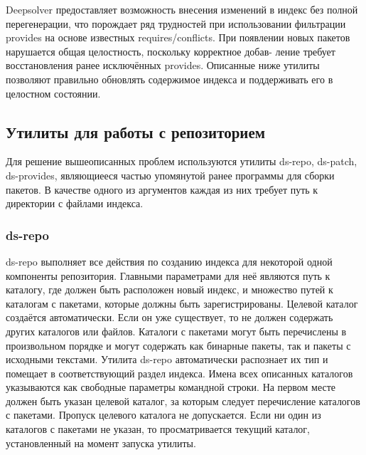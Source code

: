Deepsolver предоставляет возможность внесения изменений в индекс без
полной перегенерации, что порождает ряд трудностей при использовании
фильтрации provides на основе известных requires/conflicts. При появлении
новых пакетов нарушается общая целостность, поскольку корректное добав-
ление требует восстановления ранее исключённых provides. Описанные ниже
утилиты позволяют правильно обновлять содержимое индекса и поддерживать
его в целостном состоянии.

\subsection{Утилиты для работы с репозиторием}
Для решение вышеописанных проблем используются утилиты ds-repo, ds-patch,
ds-provides, являющиееся частью упомянутой ранее программы для сборки пакетов.
В качестве одного из аргументов каждая из них требует путь к директории с файлами индекса.

\subsubsection{ds-repo}
 ds-repo выполняет все действия по созданию индекса для некоторой
одной компоненты репозитория. Главными параметрами для неё являются
путь к каталогу, где должен быть расположен новый индекс, и множество
путей к каталогам с пакетами, которые должны быть зарегистрированы. 
Целевой каталог создаётся автоматически. Если он уже существует, то не 
должен содержать других каталогов или файлов. Каталоги с пакетами могут
быть перечислены в произвольном порядке и могут содержать как бинарные
пакеты, так и пакеты с исходными текстами. Утилита ds-repo автоматически
распознает их тип и помещает в соответствующий раздел индекса. Имена
всех описанных каталогов указываются как свободные параметры командной
строки. На первом месте должен быть указан целевой каталог, за которым
следует перечисление каталогов с пакетами. Пропуск целевого каталога
не допускается. Если ни один из каталогов с пакетами не указан, то 
просматривается текущий каталог, установленный на момент запуска утилиты.

